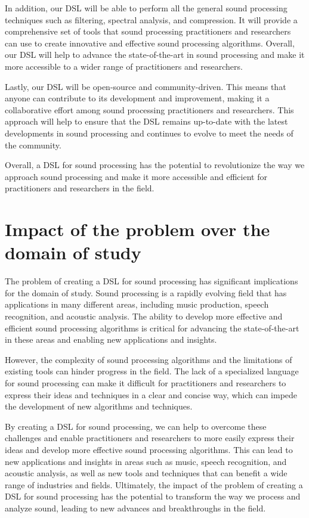In addition, our DSL will be able to perform all the general sound processing techniques such as filtering, spectral analysis, and compression. It will provide a comprehensive set of tools that sound processing practitioners and researchers can use to create innovative and effective sound processing algorithms. Overall, our DSL will help to advance the state-of-the-art in sound processing and make it more accessible to a wider range of practitioners and researchers.

Lastly, our DSL will be open-source and community-driven. This means that anyone can contribute to its development and improvement, making it a collaborative effort among sound processing practitioners and researchers. This approach will help to ensure that the DSL remains up-to-date with the latest developments in sound processing and continues to evolve to meet the needs of the community.

Overall, a DSL for sound processing has the potential to revolutionize the way we approach sound processing and make it more accessible and efficient for practitioners and researchers in the field.

\section{Impact of the problem over the domain of study} 
The problem of creating a DSL for sound processing has significant implications for the domain of study. Sound processing is a rapidly evolving field that has applications in many different areas, including music production, speech recognition, and acoustic analysis. The ability to develop more effective and efficient sound processing algorithms is critical for advancing the state-of-the-art in these areas and enabling new applications and insights.

However, the complexity of sound processing algorithms and the limitations of existing tools can hinder progress in the field. The lack of a specialized language for sound processing can make it difficult for practitioners and researchers to express their ideas and techniques in a clear and concise way, which can impede the development of new algorithms and techniques.

By creating a DSL for sound processing, we can help to overcome these challenges and enable practitioners and researchers to more easily express their ideas and develop more effective sound processing algorithms. This can lead to new applications and insights in areas such as music, speech recognition, and acoustic analysis, as well as new tools and techniques that can benefit a wide range of industries and fields. Ultimately, the impact of the problem of creating a DSL for sound processing has the potential to transform the way we process and analyze sound, leading to new advances and breakthroughs in the field.

